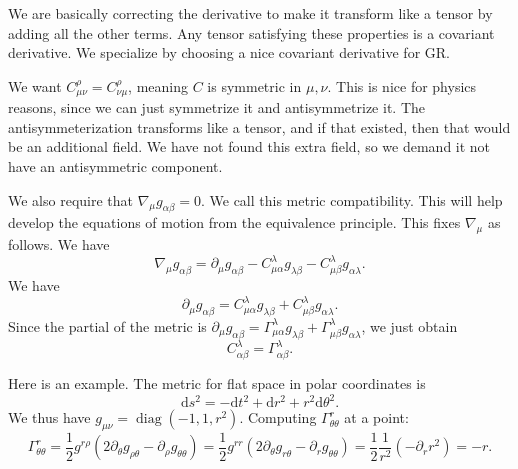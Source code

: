 We are basically correcting the derivative to make it transform like a tensor by adding all the other terms. Any tensor satisfying these properties is a covariant derivative. We specialize by choosing a nice covariant derivative for GR.

We want $C^\rho _{\mu \nu } =C_{\nu \mu } ^\rho $, meaning $C$ is symmetric in $\mu ,\nu $. This is nice for physics reasons, since we can just symmetrize it and antisymmetrize it. The antisymmeterization transforms like a tensor, and if that existed, then that would be an additional field. We have not found this extra field, so we demand it not have an antisymmetric component.

We also require that $\nabla _{\mu } g_{\alpha \beta } =0$. We call this metric compatibility. This will help develop the equations of motion from the equivalence principle. This fixes $\nabla _\mu $ as follows. We have
\[
	\nabla _\mu g_{\alpha \beta } =\partial _\mu  g_{\alpha \beta } -C_{\mu \alpha } ^\lambda  g_{\lambda \beta } -C_{\mu \beta} ^\lambda  g_{\alpha \lambda } 
.\]
We have
\[
	\partial _\mu g_{\alpha \beta } =C_{\mu \alpha } ^\lambda g_{\lambda \beta } +C_{\mu\beta } ^\lambda g_{\alpha \lambda } 
.\]
Since the partial of the metric is $\partial _\mu g_{\alpha \beta } =\Gamma _{\mu \alpha } ^\lambda g_{\lambda \beta } +\Gamma _{\mu \beta } ^\lambda g_{\alpha \lambda } $,  we just obtain
\[
	C_{\alpha \beta } ^\lambda  =\Gamma _{\alpha \beta } ^\lambda 
.\]

Here is an example. The metric for flat space in polar coordinates is
\[
	\mathrm{d} s^2 = -\mathrm{d} t^2+\mathrm{d} r^2+r^2\mathrm{d} \theta ^2
.\]
We thus have $g_{\mu \nu } =\operatorname{ dia g}(-1,1,r^2)$. Computing $\Gamma _{\theta \theta } ^r$ at a point:
\[
	\Gamma _{\theta \theta } ^r=\frac{1}{2} g^{r\rho } \left( 2 \partial _\theta g_{\rho \theta } -\partial _\rho g_{\theta \theta }  \right) =\frac{1}{2} g^{rr} \left( 2 \partial _\theta g_{r\theta } -\partial _rg_{\theta \theta }  \right) =\frac{1}{2} \frac{1}{r^2} \left( -\partial _r r^2 \right) =-r
.\]

